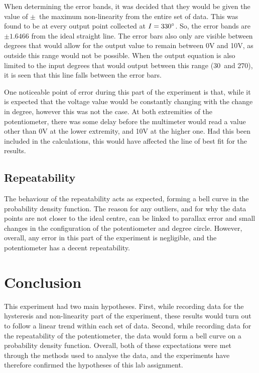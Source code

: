 \documentclass[a4,11pt]{article}
\begin{document}
When determining the error bands, it was decided that they would be given the value of $\pm$\ the maximum non-linearity from the entire set of data. This was found to be at every output point collected at $I=330\degree$. So, the error bands are $\pm1.6466$ from the ideal straight line. The error bars also only are visible between degrees that would allow for the output value to remain between 0V and 10V, as outside this range would not be possible. When the output equation is also limited to the input degrees that would output between this range (30\degree\ and 270\degree), it is seen that this line falls between the error bars.

One noticeable point of error during this part of the experiment is that, while it is expected that the voltage value would be constantly changing with the change in degree, however this was not the case. At both extremities of the potentiometer, there was some delay before the multimeter would read a value other than 0V at the lower extremity, and 10V at the higher one. Had this been included in the calculations, this would have affected the line of best fit for the results.
\subsection{Repeatability}
The behaviour of the repeatability acts as expected, forming a bell curve in the probability density function. The reason for any outliers, and for why the data points are not closer to the ideal centre, can be linked to parallax error and small changes in the configuration of the potentiometer and degree circle. However, overall, any error in this part of the experiment is negligible, and the potentiometer has a decent repeatability.
\section{Conclusion}
 This experiment had two main hypotheses. First, while recording data for the hysteresis and non-linearity part of the experiment, these results would turn out to follow a linear trend within each set of data. Second, while recording data for the repeatability of the potentiometer, the data would form a bell curve on a probability density function. Overall, both of these expectations were met through the methods used to analyse the data, and the experiments have therefore confirmed the hypotheses of this lab assignment.
 
\end{document}
